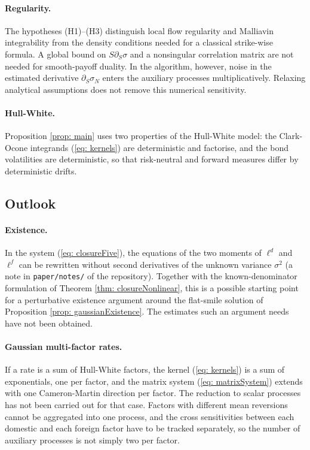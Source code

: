 \paragraph{Regularity.}
The hypotheses (H1)--(H3) distinguish local flow regularity and Malliavin
integrability from the density conditions needed for a classical strike-wise
formula. A global bound on $S\partial_S\sigma$ and a nonsingular correlation
matrix are not needed for smooth-payoff duality. In the algorithm, however,
noise in the estimated derivative $\partial_S\sigma_N$ enters the auxiliary
processes multiplicatively. Relaxing analytical assumptions does not remove
this numerical sensitivity.

\paragraph{Hull-White.} Proposition \ref{prop: main} uses two properties of the Hull-White model: the Clark-Ocone integrands (\ref{eq: kernels}) are deterministic and factorise, and the bond volatilities are deterministic, so that risk-neutral and forward measures differ by deterministic drifts.

\subsection{Outlook}
\paragraph{Existence.} In the system (\ref{eq: closureFive}), the equations of the two moments of $\ell^d$ and $\ell^f$ can be rewritten without second derivatives of the unknown variance $\sigma^2$ (a note in \texttt{paper/notes/} of the repository). Together with the known-denominator formulation of Theorem \ref{thm: closureNonlinear}, this is a possible starting point for a perturbative existence argument around the flat-smile solution of Proposition \ref{prop: gaussianExistence}. The estimates such an argument needs have not been obtained.

\paragraph{Gaussian multi-factor rates.} If a rate is a sum of Hull-White factors, the kernel (\ref{eq: kernels}) is a sum of exponentials, one per factor, and the matrix system (\ref{eq: matrixSystem}) extends with one Cameron-Martin direction per factor. The reduction to scalar processes has not been carried out for that case. Factors with different mean reversions cannot be aggregated into one process, and the cross sensitivities between each domestic and each foreign factor have to be tracked separately, so the number of auxiliary processes is not simply two per factor.

